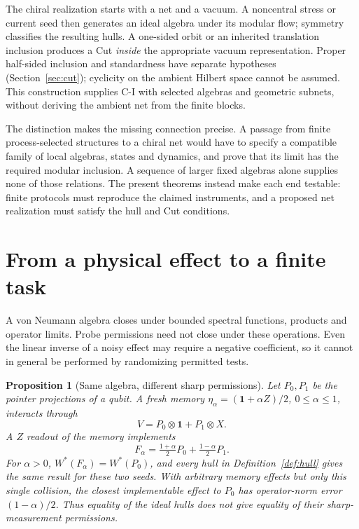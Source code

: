 \documentclass[12pt]{article}
\newtheorem{proposition}[theorem]{Proposition}
\theoremstyle{definition}
\theoremstyle{remark}
\begin{document}
The chiral realization starts with a net and a vacuum. A noncentral
stress or current seed then generates an ideal algebra under its modular
flow; symmetry classifies the resulting hulls. A one-sided orbit or an
inherited translation inclusion produces a Cut \emph{inside} the appropriate
vacuum representation. Proper half-sided inclusion and standardness have
separate hypotheses (Section~\ref{sec:cut}); cyclicity on the ambient Hilbert
space cannot be assumed. This construction supplies C-I with selected
algebras and geometric subnets, without deriving the ambient net from the
finite blocks.

The distinction makes the missing connection precise. A passage from
finite process-selected structures to a chiral net would have to specify
a compatible family of local algebras, states and dynamics, and prove that
its limit has the required modular inclusion. A sequence of larger
fixed algebras alone supplies none of those relations. The present
theorems instead make each end testable: finite protocols must reproduce
the claimed instruments, and a proposed net realization must satisfy the
hull and Cut conditions.

\section{From a physical effect to a finite task}\label{sec:permission}

A von Neumann algebra closes under bounded spectral functions, products and
operator limits. Probe permissions need not close under these operations.
Even the linear inverse of a noisy effect may require a negative coefficient,
so it cannot in general be performed by randomizing permitted tests.

\begin{proposition}[Same algebra, different sharp permissions]\label{prop:unsharp}
Let \(P_0,P_1\) be the pointer projections of a qubit. A fresh memory
\(\eta_\alpha=(\mathbf1+\alpha Z)/2\), \(0\le\alpha\le1\), interacts through
\[
V=P_0\otimes\mathbf1+P_1\otimes X .
\]
A \(Z\) readout of the memory implements
\[
F_\alpha=\tfrac{1+\alpha}{2}P_0+\tfrac{1-\alpha}{2}P_1.
\]
For \(\alpha>0\), \(W^*(F_\alpha)=W^*(P_0)\), and every hull in
Definition~\ref{def:hull} gives the same result for these two seeds.
With arbitrary memory effects but only this single collision, the closest
implementable effect to \(P_0\) has operator-norm error
\((1-\alpha)/2\). Thus equality of the ideal hulls does not give equality
of their sharp-measurement permissions.
\end{proposition}
\end{document}
